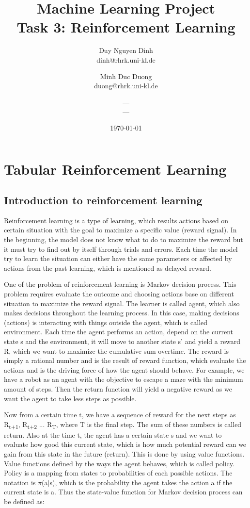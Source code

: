 \documentclass[11pt]{article}
\title{Machine Learning Project\\Task 3: Reinforcement Learning}
\author{Duy Nguyen Dinh \\ dinh@rhrk.uni-kl.de\and
	Minh Duc Duong\\ duong@rhrk.uni-kl.de\and
    ---\\ ---}
\date{\today}
\begin{document}
\maketitle

\section{Tabular Reinforcement Learning}

\subsection{Introduction to reinforcement learning}
Reinforcement learning is a type of learning, which results actions based on certain situation with the goal to maximize a specific value (reward signal). In the beginning, the model does not know what to do to maximize the reward but it must try to find out by itself through trials and errors. Each time the model try to learn the situation can either have the same parameters or affected by actions from the past learning, which is mentioned as delayed reward.

One of the problem of reinforcement learning is Markov decision process. This problem requires evaluate the outcome and choosing actions base on different situation to maximize the reward signal. The learner is called agent, which also makes decisions throughout the learning process. In this case, making decisions (actions) is interacting with things outside the agent, which is called environment. Each time the agent performs an action, depend on the current state s and the environment, it will move to another state s' and yield a reward R, which we want to maximize the cumulative sum overtime. The reward is simply a rational number and is the result of reward function, which evaluate the actions and is the driving force of how the agent should behave. For example, we have a robot as an agent with the objective to escape a maze with the minimum amount of steps. Then the return function will yield a negative reward as we want the agent to take less steps as possible.

Now from a certain time t, we have a sequence of reward for the next steps as R\textsubscript{t+1},  R\textsubscript{t+2} ... R\textsubscript{T}, where T is the final step. The sum of these numbers is called return. Also at the time t, the agent has a certain state s and we want to evaluate how good this current state, which is how much potential reward can we gain from this state in the future (return). This is done by using value functions. Value functions defined by the ways the agent behaves, which is called policy. Policy is a mapping from states to probabilities of each possible actions. The notation is $\pi$(a$\vert$s), which is the probability the agent takes the action a if the current state is a. Thus the state-value function for Markov decision process can be defined as:
\end{document}
